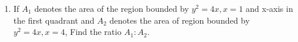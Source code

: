 \begin{enumerate}[label=\thesubsection.\arabic*, ref=\thesubsection.\theenumi]
\begin{align}
\end{align}
and
\begin{align}
\frac{2\cot x}{1+\cot^2 x}=\sin 2x.
\end{align}
Substituting these identities,
\begin{align}
A'A^{-1}
=
\myvec{
-\cos 2x&\sin 2x\\
-\sin 2x&-\cos 2x
}
\end{align}
Hence proved.
\begin{align}
A'A^{-1}
=
\myvec{
-\cos 2x&\sin 2x\\
-\sin 2x&-\cos 2x
}
\end{align}

\item
If $A_1$ denotes the area of the region bounded by $y^2 = 4x, x = 1$ and x-axis in the first quadrant and $A_2$ denotes the area of region bounded by $y^2 = 4x, x = 4$, 
Find the ratio $A_1:A_2$.


\end{enumerate}
